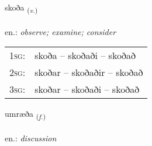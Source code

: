 \documentclass[frontgrid, backgrid]{flacards}\usepackage[]{graphicx}\usepackage[]{xcolor}
\begin{document}
\renewcommand{\blhead}{\vskip5pt {\small\bfseries\footnotesize Sagnorð | Verb }}
\renewcommand{\bcfoot}{\vskip5pt \hspace{2pt}{\small\bfseries\footnotesize 1K}}


{skoða \small{\textsubscript{(\textit{v.})}} \\[1ex] %
\textphonetic{[skɔːða]} \\
en.: \emph{observe; examine; consider} \\  [2ex]
\renewcommand*{\arraystretch}{0.8}
\begin{tabular}{p{1cm}l}
\textsc{1sg}: & skoða -- skoðaði -- skoðað \\ 
\textsc{2sg}: & skoðar -- skoðaðir -- skoðað \\ 
\textsc{3sg}: & skoðar -- skoðaði -- skoðað \\ 
\end{tabular}
}

\renewcommand{\flhead}{\vskip5pt \fboxsep=0pt {\small\bfseries\footnotesize Nafnorð | Noun}}
\renewcommand{\fcfoot}{\vskip5pt \fboxsep=0pt \hspace{2pt}{\small\bfseries\footnotesize 1K}}

\renewcommand{\blhead}{\vskip5pt {\small\bfseries\footnotesize Nafnorð | Noun }}
\renewcommand{\bcfoot}{\vskip5pt \hspace{2pt}{\small\bfseries\footnotesize 1K}}


{umræða \small{\textsubscript{(\textit{f.})}} \\[1ex] %
\textphonetic{[ʏmraiða]} \\
en.: \emph{discussion} \\  [2ex]
\renewcommand*{\arraystretch}{0.8}
}
\end{document}
